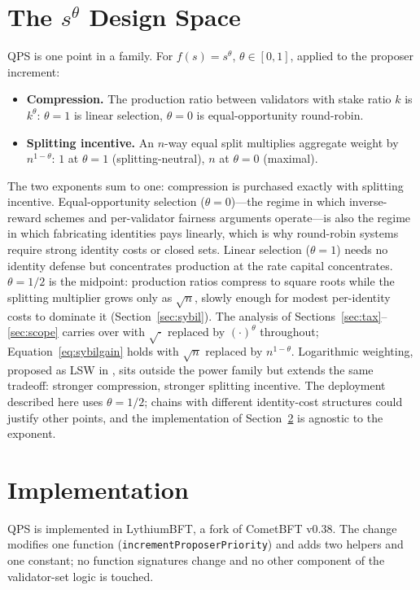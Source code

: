\documentclass[11pt,a4paper]{article}
\begin{document}
\section{The $s^\theta$ Design Space}
\label{sec:family}

QPS is one point in a family. For $f(s) = s^\theta$, $\theta \in [0,1]$, applied to the proposer increment:

\begin{itemize}
    \item \textbf{Compression.} The production ratio between validators with stake ratio $k$ is $k^\theta$: $\theta = 1$ is linear selection, $\theta = 0$ is equal-opportunity round-robin.
    \item \textbf{Splitting incentive.} An $n$-way equal split multiplies aggregate weight by $n^{1-\theta}$: $1$ at $\theta = 1$ (splitting-neutral), $n$ at $\theta = 0$ (maximal).
\end{itemize}

The two exponents sum to one: compression is purchased exactly with splitting incentive. Equal-opportunity selection ($\theta = 0$)---the regime in which inverse-reward schemes and per-validator fairness arguments operate---is also the regime in which fabricating identities pays linearly, which is why round-robin systems require strong identity costs or closed sets. Linear selection ($\theta = 1$) needs no identity defense but concentrates production at the rate capital concentrates. $\theta = 1/2$ is the midpoint: production ratios compress to square roots while the splitting multiplier grows only as $\sqrt{n}$, slowly enough for modest per-identity costs to dominate it (Section~\ref{sec:sybil}). The analysis of Sections~\ref{sec:tax}--\ref{sec:scope} carries over with $\sqrt{\cdot}$ replaced by $(\cdot)^\theta$ throughout; Equation~\eqref{eq:sybilgain} holds with $\sqrt{n}$ replaced by $n^{1-\theta}$. Logarithmic weighting, proposed as LSW in \cite{srsw}, sits outside the power family but extends the same tradeoff: stronger compression, stronger splitting incentive. The deployment described here uses $\theta = 1/2$; chains with different identity-cost structures could justify other points, and the implementation of Section~\ref{sec:impl} is agnostic to the exponent.

\section{Implementation}
\label{sec:impl}

QPS is implemented in LythiumBFT, a fork of CometBFT v0.38. The change modifies one function (\texttt{incrementProposerPriority}) and adds two helpers and one constant; no function signatures change and no other component of the validator-set logic is touched.
\end{document}
